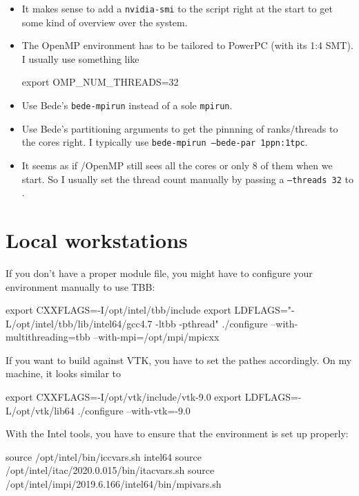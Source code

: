 \begin{itemize}
  \item It makes sense to add a \texttt{nvidia-smi} to the script right at the
  start to get some kind of overview over the system.
  \item The OpenMP environment has to be tailored to PowerPC (with its 1:4 SMT).
  I usually use something like
  \begin{code}
export OMP_NUM_THREADS=32  
  \end{code}
  \item Use Bede's \texttt{bede-mpirun} instead of a sole \texttt{mpirun}.
  \item Use Bede's partitioning arguments to get the pinnning of ranks/threads
  to the cores right. I typically use \texttt{bede-mpirun --bede-par 1ppn:1tpc}.
  \item It seems as if \Peano/OpenMP still sees all the cores or only 8 of them
  when we start. So I usually set the thread count manually by passing a
  \texttt{--threads 32} to \Peano.
\end{itemize}



\section{Local workstations}



If you don't have a proper module file, you might have to configure your environment manually to use TBB:
\begin{code}
 export CXXFLAGS=-I/opt/intel/tbb/include
 export LDFLAGS="-L/opt/intel/tbb/lib/intel64/gcc4.7 -ltbb -pthread"
 ./configure --with-multithreading=tbb --with-mpi=/opt/mpi/mpicxx
\end{code}


If you want to build against VTK, you have to set the pathes accordingly. 
On my machine, it looks similar to
\begin{code}
 export CXXFLAGS=-I/opt/vtk/include/vtk-9.0
 export LDFLAGS=-L/opt/vtk/lib64
 ./configure --with-vtk=-9.0
\end{code}


With the Intel tools, you have to ensure that the environment is set up 
properly:
\begin{code}
source /opt/intel/bin/iccvars.sh intel64
source /opt/intel/itac/2020.0.015/bin/itacvars.sh
source /opt/intel/impi/2019.6.166/intel64/bin/mpivars.sh
\end{code}
\label{label:supercomputer:Intel-scripts}


